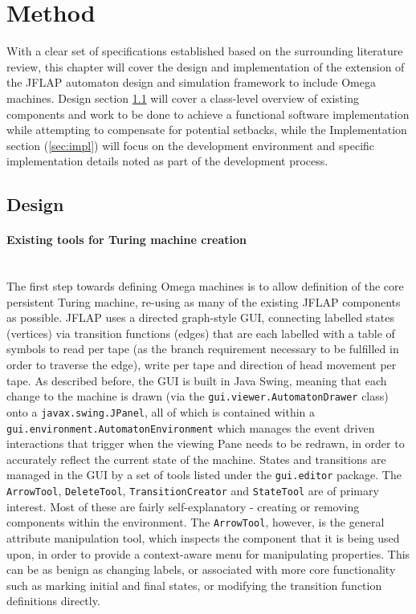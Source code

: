 \documentclass[12pt]{article}
\begin{document}
	
	\clearpage\section{Method}\label{sec4}
			With a clear set of specifications established based on the surrounding literature review, this chapter will cover the design and implementation of the extension of the JFLAP automaton design and simulation framework to include Omega machines.
			Design section \ref{sec:design} will cover a class-level overview of existing components and work to be done to achieve a functional software implementation while attempting to compensate for potential setbacks, while the Implementation section (\ref{sec:impl}) will focus on the development environment and specific implementation details noted as part of the development process.
	\subsection{Design}
	\label{sec:design}
		\paragraph{Existing tools for Turing machine creation}\hfill\\ 
			The first step towards defining Omega machines is to allow definition of the core persistent Turing machine, re-using as many of the existing JFLAP components as possible.
			JFLAP uses a directed graph-style GUI, connecting labelled states (vertices) via transition functions (edges) that are each labelled with a table of symbols to read per tape (as the branch requirement necessary to be fulfilled in order to traverse the edge), write per tape and direction of head movement per tape.
			As described before, the GUI is built in Java Swing, meaning that each change to the machine is drawn (via the \texttt{gui.viewer.AutomatonDrawer} class) onto a \texttt{javax.swing.JPanel}, all of which is contained within a \texttt{gui.environment.AutomatonEnvironment} which manages the event driven interactions that trigger when the viewing Pane needs to be redrawn, in order to accurately reflect the current state of the machine.
			States and transitions are managed in the GUI by a set of tools listed under the \texttt{gui.editor} package. The \texttt{ArrowTool}, \texttt{DeleteTool}, \texttt{TransitionCreator} and \texttt{StateTool} are of primary interest.
			Most of these are fairly self-explanatory - creating or removing components within the environment. The \texttt{ArrowTool}, however, is the general attribute manipulation tool, which inspects the component that it is being used upon, in order to provide a context-aware menu for manipulating properties.
			This can be as benign as changing labels, or associated with more core functionality such as marking initial and final states, or modifying the transition function definitions directly.
\end{document}
